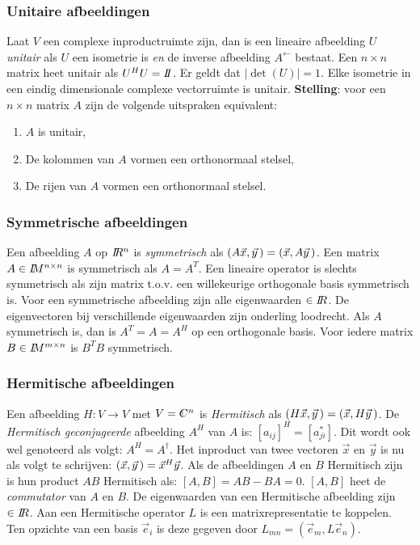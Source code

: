 \subsubsection{Unitaire afbeeldingen}
Laat $V$ een complexe inproductruimte zijn, dan is een lineaire afbeelding $U$
{\it unitair} als $U$ een isometrie is {\it en} de inverse afbeelding
$A^\leftarrow$ bestaat. Een $n\times n$ matrix heet unitair als $U^HU=I\hspace{-1mm}I$.
Er geldt dat $|\det(U)|=1$.
Elke isometrie in een eindig dimensionale complexe vectorruimte is unitair.
\npar
{\bf Stelling}: voor een $n\times n$ matrix $A$ zijn de volgende uitspraken
equivalent:
\begin{enumerate}
\item $A$ is unitair,
\item De kolommen van $A$ vormen een orthonormaal stelsel,
\item De rijen van $A$ vormen een orthonormaal stelsel.
\end{enumerate}

\subsubsection{Symmetrische afbeeldingen}
Een afbeelding $A$ op $I\hspace{-1mm}R^n$ is {\it symmetrisch} als
$(A\vec{x},\vec{y}\,)=(\vec{x},A\vec{y}\,)$. Een matrix $A\in I\hspace{-1mm}M^{n\times n}$
is symmetrisch als $A=A^T$. Een lineaire operator is slechts symmetrisch als
zijn matrix t.o.v. een willekeurige orthogonale basis symmetrisch is. Voor
een symmetrische afbeelding zijn alle eigenwaarden $\in I\hspace{-1mm}R$. De eigenvectoren
bij verschillende eigenwaarden zijn onderling loodrecht.
Als $A$ symmetrisch is, dan is $A^T=A=A^H$ op een orthogonale basis.
\npar
Voor iedere matrix $B\in I\hspace{-1mm}M^{m\times n}$ is $B^TB$ symmetrisch.

\subsubsection{Hermitische afbeeldingen}
Een afbeelding $H:V\rightarrow V$ met $V=\CC^n$ is {\it Hermitisch} als
$(H\vec{x},\vec{y}\,)=(\vec{x},H\vec{y}\,)$. De {\it Hermitisch geconjugeerde}
afbeelding $A^H$ van $A$ is: $[a_{ij}]^H=[a_{ji}^*]$. Dit wordt ook wel
genoteerd als volgt: $A^H=A^\dagger$. Het inproduct van twee vectoren $\vec{x}$
en $\vec{y}$ is nu als volgt te schrijven: $(\vec{x},\vec{y}\,)=\vec{x}^H\vec{y}$.
\npar
Als de afbeeldingen $A$ en $B$ Hermitisch zijn is hun product $AB$ Hermitisch
als: $[A,B]=AB-BA=0$. $[A,B]$ heet de {\it commutator} van $A$ en $B$.
\npar
De eigenwaarden van een Hermitische afbeelding zijn $\in I\hspace{-1mm}R$.
\npar
Aan een Hermitische operator $L$ is een matrixrepresentatie te koppelen.
Ten opzichte van een basis $\vec{e}_i$ is deze gegeven door
$L_{mn}=(\vec{e}_m,L\vec{e}_n)$.


